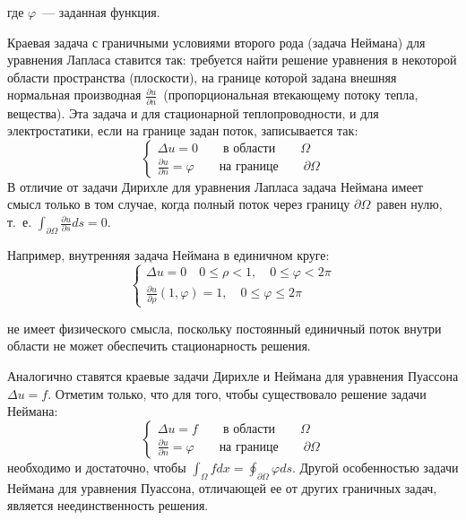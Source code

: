 где $\varphi$\, --- заданная функция.

Краевая задача с граничными условиями второго рода (задача Неймана) для
уравнения Лапласа ставится так: требуется найти решение уравнения в
некоторой области пространства (плоскости), на границе которой задана
внешняя нормальная производная $\frac{\partial u}{\partial n}$\,
(пропорциональная втекающему потоку тепла, вещества). Эта задача и для
стационарной теплопроводности, и для электростатики, если на границе
задан поток, записывается так:
\begin{equation*}
\begin{cases}
 \Delta u  = 0 \qquad \text{в области}\qquad \Omega\\
 \frac{\partial u}{\partial n}  = \varphi \qquad
 \text{на границе}\qquad \partial\Omega
\end{cases}
\end{equation*}
В отличие от задачи Дирихле для уравнения Лапласа задача Неймана имеет
смысл только в том случае, когда полный поток через границу
$\partial\Omega$\, равен нулю, т.~е.
$\int_{\partial\Omega} \frac{\partial u}{\partial s} ds =0$.


Например, внутренняя задача Неймана в единичном круге:
\begin{equation*}
\begin{cases}
 \Delta u  = 0 \quad 0 \leqslant \rho < 1, \quad 0\leqslant \varphi <
 2\pi\\
 \frac{\partial u}{\partial \rho}(1, \varphi)  = 1,\quad 0\leqslant \varphi
 \leqslant 2\pi
\end{cases}
\end{equation*}


не имеет физического смысла, поскольку постоянный единичный поток внутри
области не может обеспечить стационарность решения.


Аналогично  ставятся краевые задачи Дирихле и Неймана для уравнения
Пуассона $\Delta u =f$. Отметим только, что для того, чтобы существовало
решение задачи Неймана:
\begin{equation*}
\begin{cases}
\Delta u  = f \qquad \text{в области}\qquad \Omega\\
\frac{\partial u}{\partial n} = \varphi\qquad \text{на границе}
\qquad \partial\Omega
\end{cases}
\end{equation*}
необходимо и достаточно, чтобы
$\int_\Omega f dx = \oint_{\partial \Omega} \varphi ds$. Другой
особенностью задачи Неймана для уравнения Пуассона, отличающей ее от других
граничных задач, является неединственность решения.


